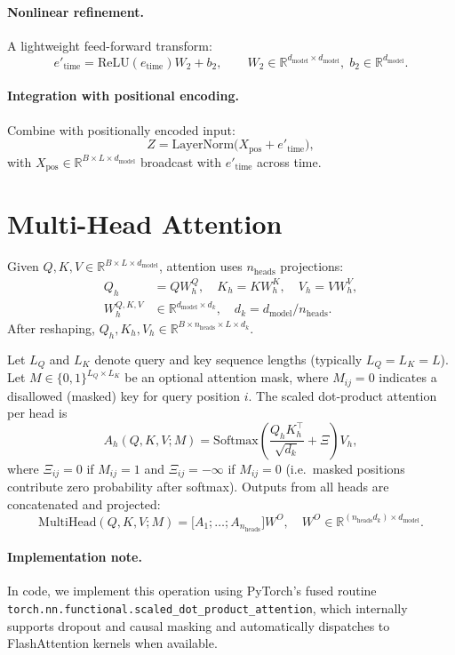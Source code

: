 \documentclass[11pt]{article}
\begin{document}
\paragraph{Nonlinear refinement.}
A lightweight feed-forward transform:
\[
e'_{\text{time}} = \text{ReLU}(e_{\text{time}}) W_2 + b_2,
\qquad
W_2 \in \mathbb{R}^{d_{\text{model}} \times d_{\text{model}}}, \;
b_2 \in \mathbb{R}^{d_{\text{model}}}.
\]

\paragraph{Integration with positional encoding.}
Combine with positionally encoded input:
\[
Z = \text{LayerNorm}\big( X_{\text{pos}} + e'_{\text{time}} \big),
\]
with $X_{\text{pos}} \in \mathbb{R}^{B\times L \times d_{\text{model}}}$ broadcast with $e'_{\text{time}}$ across time.

\section{Multi-Head Attention}

Given $Q,K,V\in\mathbb{R}^{B\times L\times d_{\text{model}}}$, attention uses $n_{\text{heads}}$ projections:
\begin{align}
Q_h &= Q W_h^Q,\quad K_h = K W_h^K,\quad V_h = V W_h^V,\\
W_h^{Q,K,V} &\in \mathbb{R}^{d_{\text{model}}\times d_k}, \quad d_k = d_{\text{model}}/n_{\text{heads}}.
\end{align}
After reshaping, $Q_h,K_h,V_h\in\mathbb{R}^{B\times n_{\text{heads}}\times L\times d_k}$.

Let $L_Q$ and $L_K$ denote query and key sequence lengths (typically $L_Q=L_K=L$).
Let $M\in\{0,1\}^{L_Q\times L_K}$ be an optional attention mask, where $M_{ij}=0$ indicates a disallowed (masked) key for query position $i$.
The scaled dot-product attention per head is
\[
A_h(Q,K,V;M)
= \mathrm{Softmax}\!\left(\frac{Q_hK_h^\top}{\sqrt{d_k}} + \Xi\right)V_h,
\]
where $\Xi_{ij}=0$ if $M_{ij}=1$ and $\Xi_{ij}=-\infty$ if $M_{ij}=0$ (i.e.\ masked positions contribute zero probability after softmax). Outputs from all heads are concatenated and projected:
\[
\text{MultiHead}(Q,K,V;M)
= \big[\!A_1;\dots;A_{n_{\text{heads}}}\!\big] W^O,
\quad
W^O\in\mathbb{R}^{(n_{\text{heads}}d_k)\times d_{\text{model}}}.
\]
\paragraph{Implementation note.}
In code, we implement this operation using PyTorch’s fused routine
\texttt{torch.nn.functional.scaled\_dot\_product\_attention},
which internally supports dropout and causal masking
and automatically dispatches to FlashAttention kernels when available.
\end{document}
